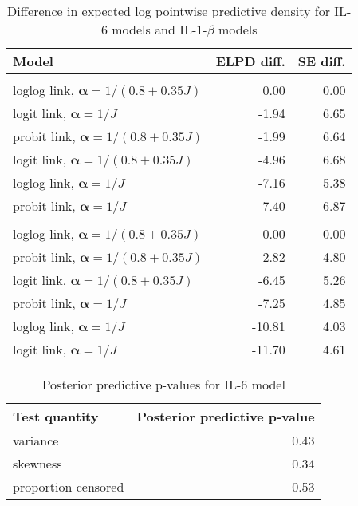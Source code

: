 \documentclass[
]{article}
\begin{document}
\begin{table}[!h]

\caption{\label{tab:elpdtab}Difference in expected log pointwise predictive density for IL-6 models and IL-1-$\beta$ models}
\centering
\begin{tabular}[t]{lrr}
\toprule
Model & ELPD diff. & SE diff.\\
\midrule
\addlinespace[0.3em]
\multicolumn{3}{l}{\textbf{IL-6}}\\
\hspace{1em}loglog link, $\boldsymbol{\alpha}=1/(0.8+0.35J)$ & 0.00 & \vphantom{1} 0.00\\
\hspace{1em}logit link, $\boldsymbol{\alpha}=1/J$ & -1.94 & 6.65\\
\hspace{1em}probit link, $\boldsymbol{\alpha}=1/(0.8+0.35J)$ & -1.99 & 6.64\\
\hspace{1em}logit link, $\boldsymbol{\alpha}=1/(0.8+0.35J)$ & -4.96 & 6.68\\
\hspace{1em}loglog link, $\boldsymbol{\alpha}=1/J$ & -7.16 & 5.38\\
\hspace{1em}probit link, $\boldsymbol{\alpha}=1/J$ & -7.40 & 6.87\\
\addlinespace[0.3em]
\multicolumn{3}{l}{\textbf{IL-1-$\beta$}}\\
\hspace{1em}loglog link, $\boldsymbol{\alpha}=1/(0.8+0.35J)$ & 0.00 & 0.00\\
\hspace{1em}probit link, $\boldsymbol{\alpha}=1/(0.8+0.35J)$ & -2.82 & 4.80\\
\hspace{1em}logit link, $\boldsymbol{\alpha}=1/(0.8+0.35J)$ & -6.45 & 5.26\\
\hspace{1em}probit link, $\boldsymbol{\alpha}=1/J$ & -7.25 & 4.85\\
\hspace{1em}loglog link, $\boldsymbol{\alpha}=1/J$ & -10.81 & 4.03\\
\hspace{1em}logit link, $\boldsymbol{\alpha}=1/J$ & -11.70 & 4.61\\
\bottomrule
\end{tabular}
\end{table}

\begin{table}[!h]

\caption{\label{tab:ppptab1}Posterior predictive p-values for IL-6 model}
\centering
\begin{tabular}[t]{lr}
\toprule
Test quantity & Posterior predictive p-value\\
\midrule
variance & 0.43\\
skewness & 0.34\\
proportion censored & 0.53\\
\bottomrule
\end{tabular}
\end{table}
\end{document}
